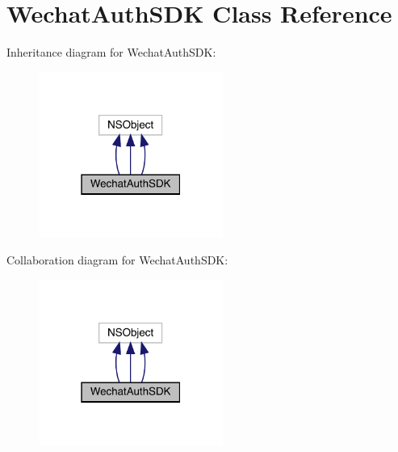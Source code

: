\hypertarget{interface_wechat_auth_s_d_k}{}\section{Wechat\+Auth\+S\+DK Class Reference}
\label{interface_wechat_auth_s_d_k}


Inheritance diagram for Wechat\+Auth\+S\+DK\+:\nopagebreak
\begin{figure}[H]
\begin{center}
\leavevmode
\includegraphics[width=171pt]{interface_wechat_auth_s_d_k__inherit__graph}
\end{center}
\end{figure}


Collaboration diagram for Wechat\+Auth\+S\+DK\+:\nopagebreak
\begin{figure}[H]
\begin{center}
\leavevmode
\includegraphics[width=171pt]{interface_wechat_auth_s_d_k__coll__graph}
\end{center}
\end{figure}

